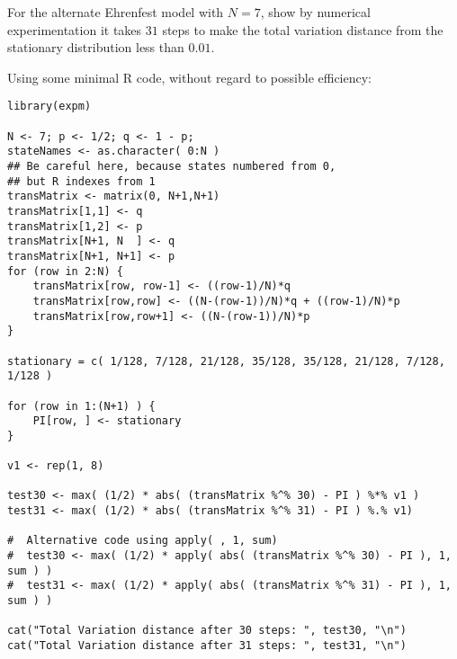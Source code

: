 \documentclass[12pt]{article}
\begin{document}
  \begin{exercise}
    For the alternate Ehrenfest model with $N = 7$, show
    by numerical
    experimentation it takes \( 31 \) steps to make the total variation
    distance from the stationary distribution less than \( 0.01 \).
  \end{exercise}
  \begin{solution}
    Using some minimal R code, without regard to possible efficiency:
\begin{verbatim}
library(expm)

N <- 7; p <- 1/2; q <- 1 - p;
stateNames <- as.character( 0:N )
## Be careful here, because states numbered from 0,
## but R indexes from 1
transMatrix <- matrix(0, N+1,N+1)
transMatrix[1,1] <- q
transMatrix[1,2] <- p
transMatrix[N+1, N  ] <- q
transMatrix[N+1, N+1] <- p
for (row in 2:N) {
    transMatrix[row, row-1] <- ((row-1)/N)*q
    transMatrix[row,row] <- ((N-(row-1))/N)*q + ((row-1)/N)*p
    transMatrix[row,row+1] <- ((N-(row-1))/N)*p
}

stationary = c( 1/128, 7/128, 21/128, 35/128, 35/128, 21/128, 7/128, 1/128 )

for (row in 1:(N+1) ) {
    PI[row, ] <- stationary
}

v1 <- rep(1, 8)

test30 <- max( (1/2) * abs( (transMatrix %^% 30) - PI ) %*% v1 )
test31 <- max( (1/2) * abs( (transMatrix %^% 31) - PI ) %.% v1)

#  Alternative code using apply( , 1, sum)
#  test30 <- max( (1/2) * apply( abs( (transMatrix %^% 30) - PI ), 1, sum ) )
#  test31 <- max( (1/2) * apply( abs( (transMatrix %^% 31) - PI ), 1, sum ) )

cat("Total Variation distance after 30 steps: ", test30, "\n")
cat("Total Variation distance after 31 steps: ", test31, "\n")
\end{verbatim}
  \end{solution}
\end{document}
